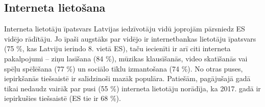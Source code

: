 \subsection{Interneta lietošana}
Interneta lietotāju īpatsvars Latvijas iedzīvotāju vidū joprojām pārsniedz ES vidējo rādītāju.
Jo īpaši augstāks par vidējo ir internetbankas lietotāju īpatsvars (75 \%, kas Latviju ierindo 8.
vietā ES), taču iecienīti ir arī citi interneta pakalpojumi – ziņu lasīšana (84 \%), mūzikas
klausīšanās, video skatīšanās vai spēļu spēlēšana (77 \%) un sociālo tīklu izmantošana
(74 \%). No otras puses, iepirkšanās tiešsaistē ir salīdzinoši mazāk populāra. Patiešām,
pagājušajā gadā tikai nedaudz vairāk par pusi (55 \%) interneta lietotāju norādīja, ka 2017.
gadā ir iepirkušies tiešsaistē (ES tie ir 68 \%).